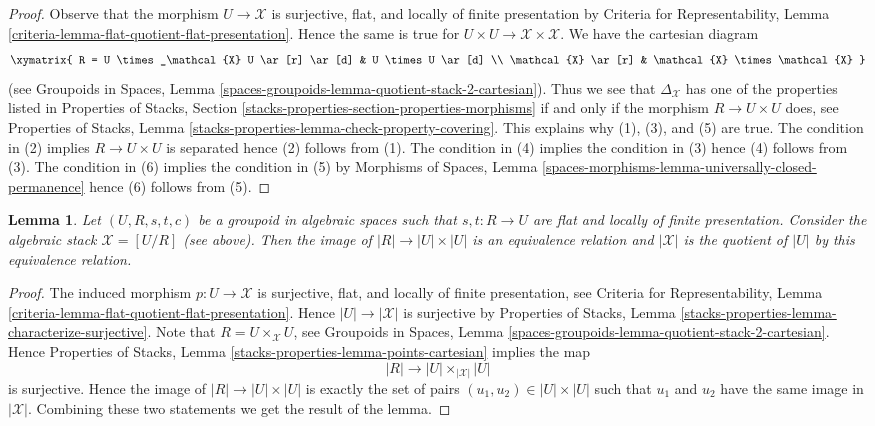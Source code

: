 \documentclass{stacks-project}
\theoremstyle{plain}
\newtheorem{lemma}[subsection]{Lemma}
\theoremstyle{definition}
\theoremstyle{remark}
\numberwithin{equation}{subsection}
\begin{document}
\begin{proof}
Observe that the morphism $U \to \mathcal{X}$ is surjective, flat, and
locally of finite presentation by
Criteria for Representability, Lemma
\ref{criteria-lemma-flat-quotient-flat-presentation}.
Hence the same is true for $U \times U \to \mathcal{X} \times \mathcal{X}$.
We have the cartesian diagram
$$
\xymatrix{
R  = U \times_\mathcal{X} U \ar[r] \ar[d] & U \times U \ar[d] \\
\mathcal{X} \ar[r] & \mathcal{X} \times \mathcal{X}
}
$$
(see Groupoids in Spaces, Lemma
\ref{spaces-groupoids-lemma-quotient-stack-2-cartesian}).
Thus we see that $\Delta_\mathcal{X}$ has one of the properties listed in
Properties of Stacks, Section
\ref{stacks-properties-section-properties-morphisms}
if and only if the morphism $R \to U \times U$ does, see
Properties of Stacks, Lemma
\ref{stacks-properties-lemma-check-property-covering}.
This explains why (1), (3), and (5) are true.
The condition in (2) implies $R \to U \times U$ is separated
hence (2) follows from (1).
The condition in (4) implies the condition in (3)
hence (4) follows from (3).
The condition in (6) implies the condition in (5)
by Morphisms of Spaces, Lemma
\ref{spaces-morphisms-lemma-universally-closed-permanence}
hence (6) follows from (5).
\end{proof}

\begin{lemma}
\label{lemma-points-presentation}
Let $(U, R, s, t, c)$ be a groupoid in algebraic spaces such that
$s, t : R \to U$ are flat and locally of finite presentation.
Consider the algebraic stack $\mathcal{X} = [U/R]$ (see above).
Then the image of $|R| \to |U| \times |U|$ is an equivalence relation
and $|\mathcal{X}|$ is the quotient of $|U|$ by this equivalence relation.
\end{lemma}

\begin{proof}
The induced morphism $p : U \to \mathcal{X}$ is surjective, flat,
and locally of finite presentation, see
Criteria for Representability, Lemma
\ref{criteria-lemma-flat-quotient-flat-presentation}.
Hence $|U| \to |\mathcal{X}|$ is surjective by
Properties of Stacks, Lemma
\ref{stacks-properties-lemma-characterize-surjective}.
Note that $R = U \times_\mathcal{X} U$, see
Groupoids in Spaces,
Lemma \ref{spaces-groupoids-lemma-quotient-stack-2-cartesian}.
Hence
Properties of Stacks, Lemma \ref{stacks-properties-lemma-points-cartesian}
implies the map
$$
|R| \longrightarrow |U| \times_{|\mathcal{X}|} |U|
$$
is surjective. Hence the image of $|R| \to |U| \times |U|$ is
exactly the set of pairs $(u_1, u_2) \in |U| \times |U|$
such that $u_1$ and $u_2$ have the same image in $|\mathcal{X}|$.
Combining these two statements we get the result of the lemma.
\end{proof}
\end{document}
